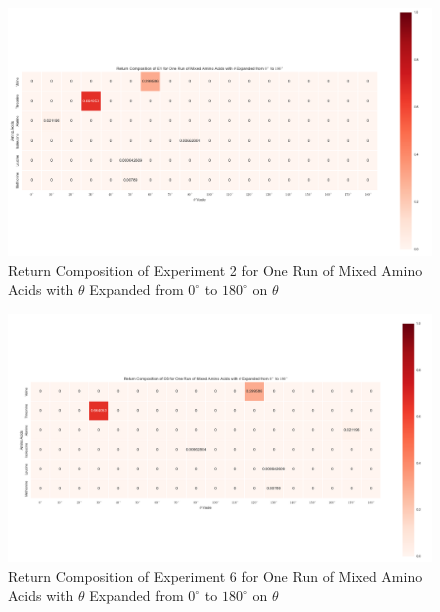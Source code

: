 \begin{figure}[!ht] \label{fig:5.5}
\centering
\includegraphics[scale=0.4]{Figures/mixture_return_composition_of_E1_for_one_run_theta_0_180.png}
\caption{Return Composition of Experiment 2 for One Run of Mixed Amino Acids with $\theta$ Expanded from $0^{\circ}$ to $180^{\circ}$ on $\theta$} 
\end{figure}

\begin{figure}[!ht] \label{fig:5.6}
\centering
\includegraphics[scale=0.4]{Figures/mixture_return_composition_of_E6_for_one_run_theta_0_180.png}
\caption{Return Composition of Experiment 6 for One Run of Mixed Amino Acids with $\theta$ Expanded from $0^{\circ}$ to $180^{\circ}$ on $\theta$} 
\end{figure}


